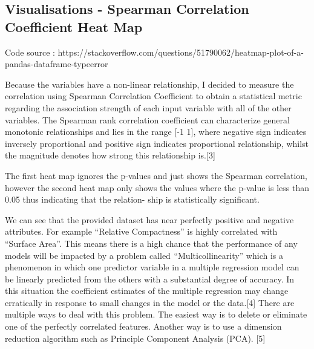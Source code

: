 \documentclass[11pt]{article}
\begin{document}
    \hypertarget{visualisations---spearman-correlation-coefficient-heat-map}{%
\subsection{Visualisations - Spearman Correlation Coefficient Heat
Map}\label{visualisations---spearman-correlation-coefficient-heat-map}}

Code source :
https://stackoverflow.com/questions/51790062/heatmap-plot-of-a-pandas-dataframe-typeerror

Because the variables have a non-linear relationship, I decided to
measure the correlation using Spearman Correlation Coefficient to obtain
a statistical metric regarding the association strength of each input
variable with all of the other variables. The Spearman rank correlation
coefficient can characterize general monotonic relationships and lies in
the range {[}-1 1{]}, where negative sign indicates inversely
proportional and positive sign indicates proportional relationship,
whilst the magnitude denotes how strong this relationship is.{[}3{]}

The first heat map ignores the p-values and just shows the Spearman
correlation, however the second heat map only shows the values where the
p-value is less than 0.05 thus indicating that the relation- ship is
statistically significant.

We can see that the provided dataset has near perfectly positive and
negative attributes. For example ``Relative Compactness'' is highly
correlated with ``Surface Area''. This means there is a high chance that
the performance of any models will be impacted by a problem called
 ``Multicollinearity'' which is a phenomenon in which one predictor
variable in a multiple regression model can be linearly predicted from
the others with a substantial degree of accuracy. In this situation the
coefficient estimates of the multiple regression may change erratically
in response to small changes in the model or the data.{[}4{]} There are
multiple ways to deal with this problem. The easiest way is to delete or
eliminate one of the perfectly correlated features. Another way is to
use a dimension reduction algorithm such as Principle Component Analysis
(PCA). {[}5{]}
\end{document}
